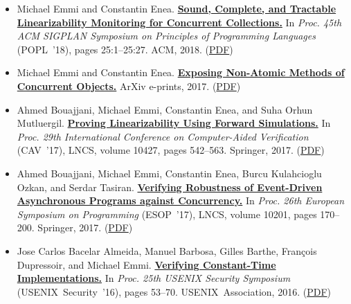 \documentclass{article}
\begin{document}
\begin{itemize}[leftmargin=0cm,label={}]
    \item Michael Emmi and Constantin Enea. {\bf\href{%
    http://doi.acm.org/10.1145/3158113}{%
    Sound, Complete, and Tractable Linearizability Monitoring for Concurrent Collections.}} In \emph{ Proc. 45th ACM SIGPLAN Symposium on Principles of Programming Languages } (POPL ’18), pages 25:1–25:27. ACM, 2018. (\href{https://michael-emmi.github.io/https://github.com/michael-emmi/research-papers/raw/master/conf-popl-EmmiE18.pdf}{PDF})


    \item Michael Emmi and Constantin Enea. {\bf\href{%
    https://arxiv.org/abs/1706.09305}{%
    Exposing Non-Atomic Methods of Concurrent Objects.}} ArXiv e-prints, 2017. (\href{https://michael-emmi.github.io/https://github.com/michael-emmi/research-papers/raw/master/journals-corr-EmmiE17.pdf}{PDF})


    \item Ahmed Bouajjani, Michael Emmi, Constantin Enea, and Suha Orhun Mutluergil. {\bf\href{%
    https://doi.org/10.1007/978-3-319-63390-9}{%
    Proving Linearizability Using Forward Simulations.}} In \emph{ Proc. 29th International Conference on Computer-Aided Verification } (CAV ’17), LNCS, volume 10427, pages 542–563. Springer, 2017. (\href{https://michael-emmi.github.io/https://github.com/michael-emmi/research-papers/raw/master/conf-cav-BouajjaniEEM17.pdf}{PDF})


    \item Ahmed Bouajjani, Michael Emmi, Constantin Enea, Burcu Kulahcioglu Ozkan, and Serdar Tasiran. {\bf\href{%
    http://dx.doi.org/10.1007/978-3-662-54434-1_7}{%
    Verifying Robustness of Event-Driven Asynchronous Programs against Concurrency.}} In \emph{ Proc. 26th European Symposium on Programming } (ESOP ’17), LNCS, volume 10201, pages 170–200. Springer, 2017. (\href{https://michael-emmi.github.io/https://github.com/michael-emmi/research-papers/raw/master/conf-esop-BouajjaniEEOT17.pdf}{PDF})


    \item Jose Carlos Bacelar Almeida, Manuel Barbosa, Gilles Barthe, François Dupressoir, and Michael Emmi. {\bf\href{%
    https://www.usenix.org/conference/usenixsecurity16/technical-sessions/presentation/almeida}{%
    Verifying Constant-Time Implementations.}} In \emph{ Proc. 25th USENIX Security Symposium } (USENIX Security ’16), pages 53–70. USENIX Association, 2016. (\href{https://michael-emmi.github.io/https://github.com/michael-emmi/research-papers/raw/master/conf-uss-AlmeidaBBDE16.pdf}{PDF})



\end{itemize}
\end{document}
